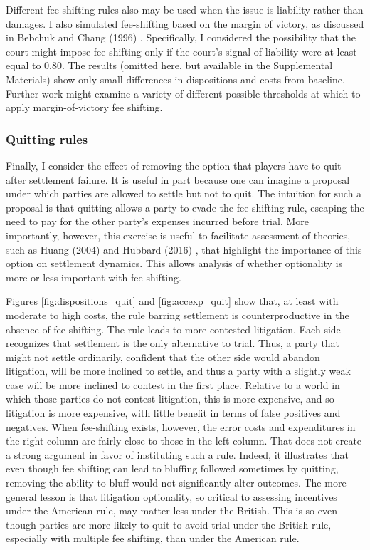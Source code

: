 \documentclass{article}
\begin{document}
Different fee-shifting rules also may be used when the issue is liability rather than damages. I also simulated fee-shifting based on the margin of victory, as discussed in Bebchuk and Chang (1996) \cite{bebchukchang}. Specifically, I considered the possibility that the court might impose fee shifting only if the court's signal of liability were at least equal to 0.80. The results (omitted here, but available in the Supplemental Materials) show only small differences in dispositions and costs from baseline. Further work might examine a variety of different possible thresholds at which to apply margin-of-victory fee shifting.

\subsubsection{Quitting rules}

Finally, I consider the effect of removing the option that players have to quit after settlement failure. It is  useful in part because one can imagine a proposal under which parties are allowed to settle but not to quit. The intuition for such a proposal is that quitting allows a party to evade the fee shifting rule, escaping the need to pay for the other party's expenses incurred before trial. More importantly, however, this exercise is useful to facilitate assessment of theories, such as Huang (2004) \cite{huang} and Hubbard (2016) \cite{hubbard}, that highlight the importance of this option on settlement dynamics. This allows analysis of whether optionality is more or less important with fee shifting.

Figures \ref{fig:dispositions_quit} and \ref{fig:accexp_quit} show that, at least with moderate to high costs, the rule barring settlement is counterproductive in the absence of fee shifting. The rule leads to more contested litigation. Each side recognizes that settlement is the only alternative to trial. Thus, a party that might not settle ordinarily, confident that the other side would abandon litigation, will be more inclined to settle, and thus a party with a slightly weak case will be more inclined to contest in the first place. Relative to a world in which those parties do not contest litigation, this is more expensive, and so litigation is more expensive, with little benefit in terms of false positives and negatives. When fee-shifting exists, however, the error costs and expenditures in the right column are fairly close to those in the left column. That does not create a strong argument in favor of instituting such a rule. Indeed, it illustrates that even though fee shifting can lead to bluffing followed sometimes by quitting, removing the ability to bluff would not significantly alter outcomes. The more general lesson is that litigation optionality, so critical to assessing incentives under the American rule, may matter less under the British. This is so even though parties are more likely to quit to avoid trial under the British rule, especially with multiple fee shifting, than under the American rule. 
\end{document}
